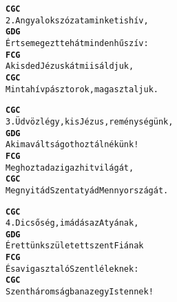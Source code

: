 \begin{minipage}{\textwidth}
\kottastart
{}
\kottaend
\begin{minipage}{\textwidth}
\begin{multicols}{2}
\begin{minipage}{\textwidth}
\begin{alltt}
\textbf{   C                 G         C}
2. Angyalok szózata minket is hív,
\textbf{   G                    D          G}
   Értse meg ezt tehát minden hű szív:
\textbf{   F                  C        G}
   A kisded Jézuskát mi is áldjuk,
\textbf{    C                     G        C}
   Mint a hív pásztorok, magasztaljuk.
\end{alltt}
\vspace{0.0cm}
\versszakspacing
\end{minipage}
\begin{minipage}{\textwidth}
\begin{alltt}
\textbf{    C                     G       C}
3. Üdvözlégy, kis Jézus, reménységünk,
\textbf{   G                 D        G}
   Aki ma váltságot hoztál nékünk!
\textbf{    F                 C       G}
   Meghoztad az igaz hit világát,
\textbf{    C                    G         C}
   Megnyitád Szentatyád Mennyországát.
\end{alltt}
\vspace{0.0cm}
\versszakspacing
\end{minipage}
\begin{minipage}{\textwidth}
\begin{alltt}
\textbf{    C               G       C}
4. Dicsőség, imádás az Atyának,
\textbf{   G                    D       G}
   Érettünk született szent Fiának
\textbf{   F                 C        G}
   És a vigasztaló Szentléleknek:
\textbf{     C                 G         C}
   Szentháromságban az egy Istennek!
\end{alltt}
\vspace{0.0cm}
\versszakspacing
\end{minipage}
\vspace{0.2cm}
\end{multicols}
\end{minipage}

\end{minipage}
~\vspace{1.0cm}
\newline
